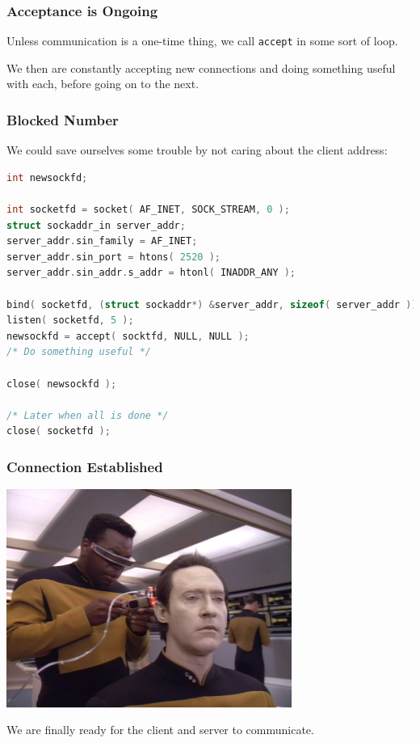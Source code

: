 \begin{frame}
\frametitle{Acceptance is Ongoing}

Unless communication is a one-time thing, we call \texttt{accept} in some sort of loop. 

We then are constantly accepting new connections and doing something useful with each, before going on to the next.

\end{frame}


\begin{frame}[fragile]
\frametitle{Blocked Number}

We could save ourselves some trouble by not caring about the client address:

\begin{lstlisting}[language=C]
int newsockfd;

int socketfd = socket( AF_INET, SOCK_STREAM, 0 );
struct sockaddr_in server_addr;
server_addr.sin_family = AF_INET;
server_addr.sin_port = htons( 2520 );
server_addr.sin_addr.s_addr = htonl( INADDR_ANY );

bind( socketfd, (struct sockaddr*) &server_addr, sizeof( server_addr ));
listen( socketfd, 5 );
newsockfd = accept( socktfd, NULL, NULL );
/* Do something useful */

close( newsockfd );

/* Later when all is done */
close( socketfd );
\end{lstlisting}



\end{frame}


\begin{frame}
\frametitle{Connection Established}

\begin{center}
	\includegraphics[width=0.7\textwidth]{images/data-connection.jpg}
\end{center}

We are finally ready for the client and server to communicate.

\end{frame}



